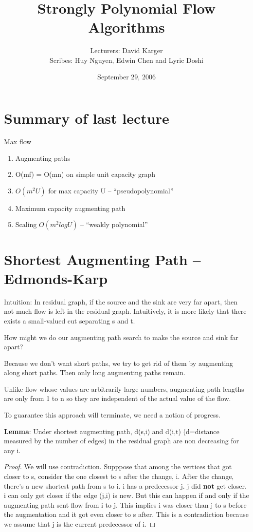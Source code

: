 \documentclass{article}
\title{Strongly Polynomial Flow Algorithms}
\date{September 29, 2006}
\author{Lecturers: David Karger\\ Scribes: Huy Nguyen, Edwin Chen and Lyric Doshi}
\begin{document}
  
  \section{Summary of last lecture}
  Max flow
  \begin{enumerate}
  \item Augmenting paths
  \item O(mf) = O(mn) on simple unit capacity graph
  \item $O(m^2U)$ for max capacity U -- ``pseudopolynomial''
  \item Maximum capacity augmenting path
  \item Scaling $O(m^2logU)$ -- ``weakly polynomial''
  \end{enumerate}
  \section{Shortest Augmenting Path -- Edmonds-Karp}
  Intuition: In residual graph, if the source and the sink are very far apart, then not much flow is left in the residual graph. Intuitively, it is more likely that there exists a small-valued cut separating s and t.

  How might we do our augmenting path search to make the source and sink far apart?
  
  Because we don't want short paths, we try to get rid of them by augmenting along short paths. Then only long augmenting paths remain.

  Unlike flow whose values are arbitrarily large numbers, augmenting path lengths are only from 1 to n so they are independent of the actual value of the flow.
  
  To guarantee this approach will terminate, we need a notion of progress.
  
  \textbf{Lemma}:
  Under shortest augmenting path, d(s,i) and d(i,t) (d=distance measured by the number of edges) in the residual graph are non decreasing for any i.

  \begin{proof}
    We will use contradiction. Supppose that among the vertices that got closer to s, consider the one closest to s after the change, i. After the change, there's a new shortest path from s to i. i has a predecessor j. j did \textbf{not} get closer. i can only get closer if the edge (j,i) is new. But this can happen if and only if the augmenting path sent flow from i to j. This implies i was closer than j to s before the augmentation and it got even closer to s after. This is a contradiction because we assume that j is the current predecessor of i.
  \end{proof}
\end{document}
